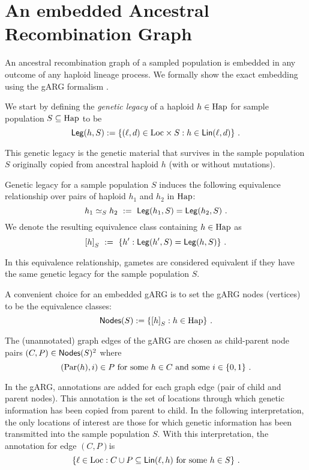 \documentclass{article}
\begin{document}
\section{An embedded Ancestral Recombination Graph}

An ancestral recombination graph \cite{friedman_ancestral_1997}
\cite{hein_gene_2005} \cite{wakeley_coalescent_2009} of a sampled
population is embedded in any outcome of any haploid lineage process.
We formally show the
exact embedding using the gARG formalism \cite{wong_what_arg_2022}.

We start by defining the \emph{genetic legacy} of a haploid
$h \in \mathrm{Hap}$ for sample population $S \subseteq \mathrm{Hap}$ to be
$$
  \mathsf{Leg}(h, S) := \{ (\ell, d) \in \mathrm{Loc} \times S : h \in \mathsf{Lin}(\ell, d) \}
\text{ .}
$$

This genetic legacy is the genetic material that survives in the
sample population $S$ originally copied from ancestral haploid $h$
(with or without mutations).

Genetic legacy for a sample population $S$ induces the following
equivalence relationship over pairs of haploid $h_1$ and $h_2$ in
$\mathrm{Hap}$:
$$
h_1 \simeq_S h_2 \ := \ \mathsf{Leg}(h_1, S) = \mathsf{Leg}(h_2, S)
\text{ .}
$$
We denote the resulting equivalence class containing $h \in \mathrm{Hap}$ as
$$
{[h]}_S \ := \ \{ h' : \mathsf{Leg}(h', S) = \mathsf{Leg}(h, S) \}
\text{ .}
$$

In this equivalence relationship, gametes are considered equivalent if
they have the same genetic legacy for the sample population $S$.

A convenient choice for an embedded gARG \cite{wong_what_arg_2022} is
to set the gARG nodes (vertices) to be the equivalence classes:
$$
   \mathsf{Nodes}(S) := \{ {[h]}_S : h \in \mathrm{Hap} \}
\text{ .}
$$

The (unannotated) graph edges of the gARG are chosen as child-parent
node pairs $(C, P) \in \mathsf{Nodes}(S)^2$ where
$$
  (\mathrm{Par}(h), i) \in P \text{ for some $h \in C$ and some $i \in \{0, 1\}$ .}
$$

In the gARG, annotations are added for each graph edge (pair of child
and parent nodes). This annotation is the set of locations through which
genetic information has been copied from parent to child. In the
following interpretation, the only locations of interest are those for
which genetic information has been transmitted into the sample
population $S$. With this interpretation, the annotation for edge
$(C,P)$is
$$
  \{ \ell \in \mathrm{Loc} :
     C \cup P \subseteq \mathsf{Lin}(\ell, h) \text{ for some $h \in S$}
  \}
\text{ .}
$$
\end{document}
